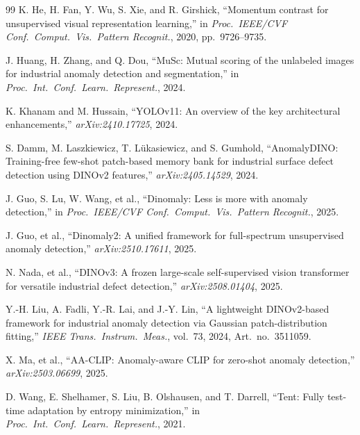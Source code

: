 \documentclass[journal]{IEEEtran}
\begin{document}
\begin{thebibliography}{99}
 K. He, H. Fan, Y. Wu, S. Xie, and R. Girshick, ``Momentum contrast for unsupervised visual representation learning,'' in \textit{Proc.\ IEEE/CVF Conf.\ Comput.\ Vis.\ Pattern Recognit.}, 2020, pp.~9726--9735.

 J. Huang, H. Zhang, and Q. Dou, ``MuSc: Mutual scoring of the unlabeled images for industrial anomaly detection and segmentation,'' in \textit{Proc.\ Int.\ Conf.\ Learn.\ Represent.}, 2024.

 K. Khanam and M. Hussain, ``YOLOv11: An overview of the key architectural enhancements,'' \textit{arXiv:2410.17725}, 2024.

 S. Damm, M. Laszkiewicz, T. L\"ukasiewicz, and S. Gumhold, ``AnomalyDINO: Training-free few-shot patch-based memory bank for industrial surface defect detection using DINOv2 features,'' \textit{arXiv:2405.14529}, 2024.

 J. Guo, S. Lu, W. Wang, et al., ``Dinomaly: Less is more with anomaly detection,'' in \textit{Proc.\ IEEE/CVF Conf.\ Comput.\ Vis.\ Pattern Recognit.}, 2025.

 J. Guo, et al., ``Dinomaly2: A unified framework for full-spectrum unsupervised anomaly detection,'' \textit{arXiv:2510.17611}, 2025.

 N. Nada, et al., ``DINOv3: A frozen large-scale self-supervised vision transformer for versatile industrial defect detection,'' \textit{arXiv:2508.01404}, 2025.

 Y.-H. Liu, A. Fadli, Y.-R. Lai, and J.-Y. Lin, ``A lightweight DINOv2-based framework for industrial anomaly detection via Gaussian patch-distribution fitting,'' \textit{IEEE Trans.\ Instrum.\ Meas.}, vol.~73, 2024, Art.\ no.~3511059.


 X. Ma, et al., ``AA-CLIP: Anomaly-aware CLIP for zero-shot anomaly detection,'' \textit{arXiv:2503.06699}, 2025.

 D. Wang, E. Shelhamer, S. Liu, B. Olshausen, and T. Darrell, ``Tent: Fully test-time adaptation by entropy minimization,'' in \textit{Proc.\ Int.\ Conf.\ Learn.\ Represent.}, 2021.

\end{thebibliography}
\end{document}
